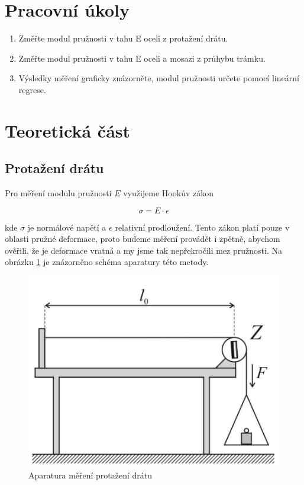 \section{Pracovní úkoly}

\begin{enumerate}
\item Změřte modul pružnosti v tahu E oceli z protažení drátu.

\item Změřte modul pružnosti v tahu E oceli a mosazi z průhybu trámku.

\item Výsledky měření graficky znázorněte, modul pružnosti určete pomocí lineární regrese.

\end{enumerate}

\section{Teoretická část}

\subsection{Protažení drátu}

Pro měření modulu pružnosti \(E\) využijeme Hookův zákon

\begin{equation}
    \sigma = E \cdot \epsilon
\end{equation}

kde \(\sigma\) je normálové napětí a \(\epsilon\) relativní prodloužení. Tento zákon platí pouze v oblasti pružné deformace, proto budeme měření provádět i zpětně, abychom ověřili, že je deformace vratná a my jsme tak nepřekročili mez pružnosti. Na obrázku \ref{fig:aparatura-protazeni-dratu} je znázorněno schéma aparatury této metody.

\begin{figure}[h]
    \centering
    \includegraphics[width=0.5\linewidth]{09 - Měření modulu pružnosti v tahu//Protokol_modul pružnosti//img/Aparatura_protažení drátu.png}
    \caption{Aparatura měření protažení drátu}
    \label{fig:aparatura-protazeni-dratu}
\end{figure}

